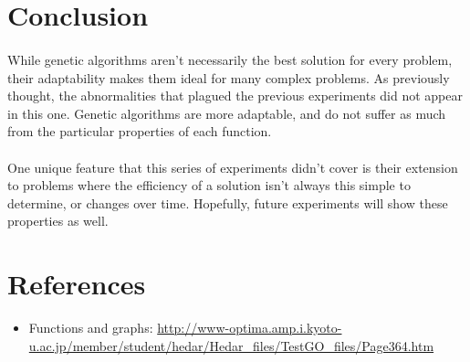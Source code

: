 \documentclass{article}
\begin{document}
    \newpage
    \section{Conclusion}
    \paragraph{}
    While genetic algorithms aren't necessarily the best solution for every problem, their adaptability makes them ideal for many complex problems. As previously thought, the abnormalities that plagued the previous experiments did not appear in this one. Genetic algorithms are more adaptable, and do not suffer as much from the particular properties of each function.
    \paragraph{}
    One unique feature that this series of experiments didn't cover is their extension to problems where the efficiency of a solution isn't always this simple to determine, or changes over time. Hopefully, future experiments will show these properties as well.

    \section{References}
    \begin{itemize}
        \item Functions and graphs: \url{http://www-optima.amp.i.kyoto-u.ac.jp/member/student/hedar/Hedar_files/TestGO_files/Page364.htm}
    \end{itemize}
\end{document}
